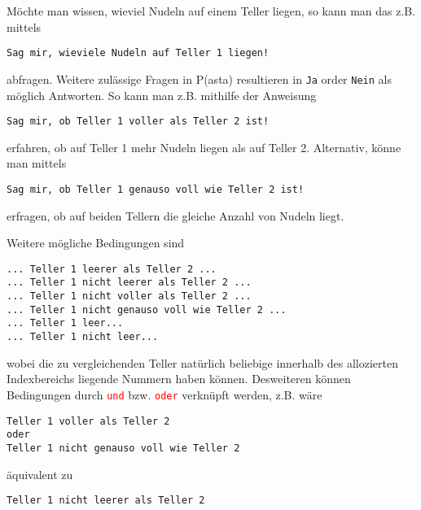 \documentclass[11pt]{book}
\begin{document}
M\"ochte man wissen, wieviel Nudeln auf einem Teller liegen, so kann man das z.B.
mittels
\color{blue}
\begin{lstlisting}
Sag mir, wieviele Nudeln auf Teller 1 liegen!
\end{lstlisting}
\color{black}
abfragen. Weitere zul\"assige Fragen in P(asta) resultieren in 
\color{purple}
\lstinline{Ja}
\color{black}
order
\color{purple}
\lstinline{Nein}
\color{black}
als m\"oglich Antworten.
So kann man z.B. mithilfe der Anweisung
\color{blue}
\begin{lstlisting}
Sag mir, ob Teller 1 voller als Teller 2 ist!
\end{lstlisting}
\color{black}
erfahren, ob auf Teller 1 mehr Nudeln liegen als auf Teller 2.
Alternativ, k\"onne man mittels
\color{blue}
\begin{lstlisting}
Sag mir, ob Teller 1 genauso voll wie Teller 2 ist!
\end{lstlisting}
\color{black}
erfragen, ob auf beiden Tellern die gleiche Anzahl von Nudeln liegt.

Weitere m\"ogliche Bedingungen sind
\color{blue}
\begin{lstlisting}
... Teller 1 leerer als Teller 2 ...
... Teller 1 nicht leerer als Teller 2 ...
... Teller 1 nicht voller als Teller 2 ...
... Teller 1 nicht genauso voll wie Teller 2 ...
... Teller 1 leer...
... Teller 1 nicht leer...
\end{lstlisting}
\color{black}
wobei die zu vergleichenden Teller nat\"urlich beliebige
innerhalb des allozierten Indexbereichs liegende Nummern
haben k\"onnen. Desweiteren k\"onnen Bedingungen durch 
\textcolor{red}{\lstinline{und}} bzw. \textcolor{red}{\lstinline{oder}}
verkn\"upft werden, z.B. w\"are
\color{blue}
\begin{lstlisting}
Teller 1 voller als Teller 2 
oder 
Teller 1 nicht genauso voll wie Teller 2
\end{lstlisting}
\color{black}
\"aquivalent zu 
\color{blue}
\begin{lstlisting}
Teller 1 nicht leerer als Teller 2
\end{lstlisting}
\color{black}
\end{document}
